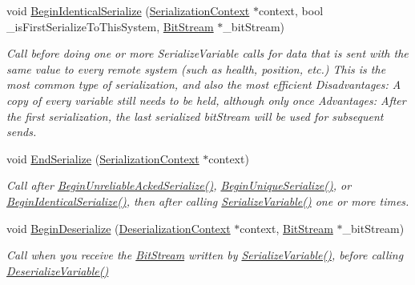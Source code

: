 \begin{DoxyCompactItemize}
void \hyperlink{class_rak_net_1_1_variable_delta_serializer_a3ba21dc59bc10fa337c02d79a785e344}{Begin\-Identical\-Serialize} (\hyperlink{struct_rak_net_1_1_variable_delta_serializer_1_1_serialization_context}{Serialization\-Context} $\ast$context, bool \-\_\-is\-First\-Serialize\-To\-This\-System, \hyperlink{class_rak_net_1_1_bit_stream}{Bit\-Stream} $\ast$\-\_\-bit\-Stream)
\begin{DoxyCompactList}\small\item\em Call before doing one or more Serialize\-Variable calls for data that is sent with the same value to every remote system (such as health, position, etc.) This is the most common type of serialization, and also the most efficient Disadvantages\-: A copy of every variable still needs to be held, although only once Advantages\-: After the first serialization, the last serialized bit\-Stream will be used for subsequent sends. \end{DoxyCompactList}\item 
void \hyperlink{class_rak_net_1_1_variable_delta_serializer_a08a27cab67d35fd2fa80fefcc6a0ff13}{End\-Serialize} (\hyperlink{struct_rak_net_1_1_variable_delta_serializer_1_1_serialization_context}{Serialization\-Context} $\ast$context)
\begin{DoxyCompactList}\small\item\em Call after \hyperlink{class_rak_net_1_1_variable_delta_serializer_ae755cec2f8482621b134f1537a818d98}{Begin\-Unreliable\-Acked\-Serialize()}, \hyperlink{class_rak_net_1_1_variable_delta_serializer_ad3c9911d1d42bd432d622c98097f14a3}{Begin\-Unique\-Serialize()}, or \hyperlink{class_rak_net_1_1_variable_delta_serializer_a3ba21dc59bc10fa337c02d79a785e344}{Begin\-Identical\-Serialize()}, then after calling \hyperlink{class_rak_net_1_1_variable_delta_serializer_a1f770773fb03107c9bf6c1acd301a8d6}{Serialize\-Variable()} one or more times. \end{DoxyCompactList}\item 
void \hyperlink{class_rak_net_1_1_variable_delta_serializer_a5cea057c2704378cc1268af235ff7b1e}{Begin\-Deserialize} (\hyperlink{struct_rak_net_1_1_variable_delta_serializer_1_1_deserialization_context}{Deserialization\-Context} $\ast$context, \hyperlink{class_rak_net_1_1_bit_stream}{Bit\-Stream} $\ast$\-\_\-bit\-Stream)
\begin{DoxyCompactList}\small\item\em Call when you receive the \hyperlink{class_rak_net_1_1_bit_stream}{Bit\-Stream} written by \hyperlink{class_rak_net_1_1_variable_delta_serializer_a1f770773fb03107c9bf6c1acd301a8d6}{Serialize\-Variable()}, before calling \hyperlink{class_rak_net_1_1_variable_delta_serializer_ac7784665aecbdb82c929878c8a5a3007}{Deserialize\-Variable()} \end{DoxyCompactList}\item 

\end{DoxyCompactItemize}
